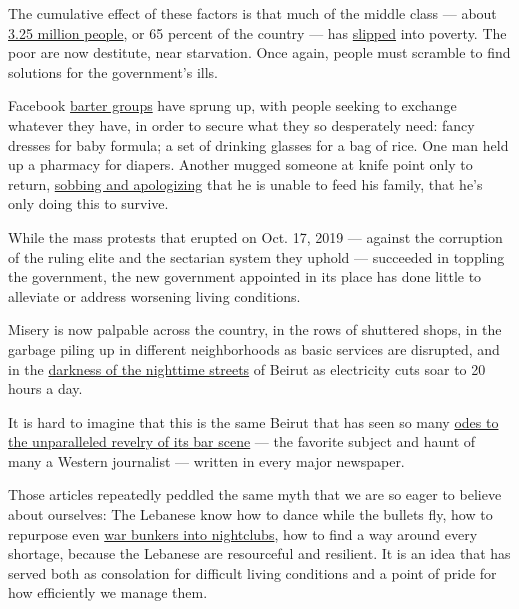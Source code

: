 The cumulative effect of these factors is that much of the middle class
--- about
\href{https://foreignpolicy.com/2020/05/21/lebanon-coronavirus-middle-class-poverty/}{3.25
million people}, or 65 percent of the country --- has
\href{https://carnegie-mec.org/diwan/82348}{slipped} into poverty. The
poor are now destitute, near starvation. Once again, people must
scramble to find solutions for the government's ills.

Facebook
\href{https://www.nytimes3xbfgragh.onion/2020/07/12/world/middleeast/beirut-lebanon-economic-crisis.html}{barter
groups} have sprung up, with people seeking to exchange whatever they
have, in order to secure what they so desperately need: fancy dresses
for baby formula; a set of drinking glasses for a bag of rice. One man
held up a pharmacy for diapers. Another mugged someone at knife point
only to return,
\href{https://www.france24.com/en/20200715-hunger-crimes-on-the-rise-in-crisis-hit-lebanon}{sobbing
and apologizing} that he is unable to feed his family, that he's only
doing this to survive.

While the mass protests that erupted on Oct. 17, 2019 --- against the
corruption of the ruling elite and the sectarian system they uphold ---
succeeded in toppling the government, the new government appointed in
its place has done little to alleviate or address worsening living
conditions.

Misery is now palpable across the country, in the rows of shuttered
shops, in the garbage piling up in different neighborhoods as basic
services are disrupted, and in the
\href{https://www.washingtonpost.com/world/middle_east/lebanons-rising-power-cuts-add-to-gloom-of-economic-crisis/2020/07/07/95498db4-c05f-11ea-8908-68a2b9eae9e0_story.html}{darkness
of the nighttime streets} of Beirut as electricity cuts soar to 20 hours
a day.

It is hard to imagine that this is the same Beirut that has seen so many
\href{https://www.telegraph.co.uk/news/worldnews/middleeast/lebanon/11748872/War-is-a-million-miles-away-when-the-Lebanese-begin-to-party.html}{odes
to the unparalleled revelry of its bar scene} --- the favorite subject
and haunt of many a Western journalist --- written in every major
newspaper.

Those articles repeatedly peddled the same myth that we are so eager to
believe about ourselves: The Lebanese know how to dance while the
bullets fly, how to repurpose even
\href{https://www.washingtonpost.com/lifestyle/travel/interior-designer-sarah-a-abdallah-brings-a-global-perspective-to-hotel-lobbies-and-restaurants/2018/02/09/8ef88344-f72a-11e7-a9e3-ab18ce41436a_story.html}{war
bunkers into nightclubs}, how to find a way around every shortage,
because the Lebanese are resourceful and resilient. It is an idea that
has served both as consolation for difficult living conditions and a
point of pride for how efficiently we manage them.

